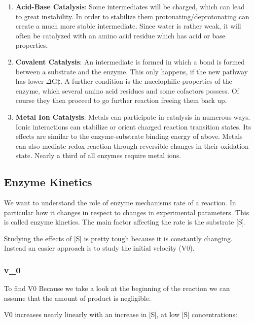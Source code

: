 \documentclass[../main.tex]{subfiles}
\begin{document}
\begin{enumerate}
	\item \textbf{\gls{Acid-Base Catalysis}}: Some intermediates will be charged, which can lead to great instability. In order to stabilize them protonating/deprotonating can create a much more stable intermediate. Since water is rather weak, it will often be catalyzed with an amino acid residue which has acid or base properties.
	\item \textbf{\gls{Covalent Catalysis}}: An intermediate is formed in which a bond is formed between a substrate and the enzyme. This only happens, if the new pathway has lower $\Delta$G$\ddagger$. A further condition is the nucelophilic properties of the enzyme, which several amino acid residues and some cofactors possess. Of course they then proceed to go further reaction freeing them back up.
	\item \textbf{\gls{Metal Ion Catalysis}}: Metals can participate in catalysis in numerous ways. Ionic interactions can stabilize or orient charged reaction transition states. Its effects are similar to the enzyme-substrate binding energy of above. Metals can also mediate redox reaction through reversible changes in their oxidation state. Nearly a third of all enzymes require metal ions.
\end{enumerate}


\subsection{\gls{Enzyme Kinetics}}

We want to understand the role of enzyme mechanisms rate of a reaction. In particular how it changes in respect to changes in experimental parameters. This is called enzyme kinetics. The main factor affecting the rate is the substrate [S]. 

Studying the effects of [S] is pretty tough because it is constantly changing. Instead an easier approach is to study the initial velocity (V0).

\subsubsection{\gls{v_0}}

To find V0 Because we take a look at the beginning of the reaction we can assume that the amount of product is negligible.

V0 increases nearly linearly with an increase in [S], at low [S] concentrations:
\end{document}

